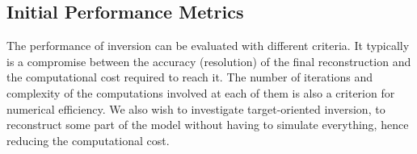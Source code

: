 \subsection{Initial Performance Metrics}
\label{sec:WP4:Hawen:metrics}


The performance of inversion can be evaluated with different
criteria. 
It typically is a compromise between the accuracy (resolution) 
of the final reconstruction and the computational cost required
to reach it. 
The number of iterations and complexity of the computations involved 
at each of them is also a criterion for numerical efficiency.
We also wish to investigate target-oriented inversion, to reconstruct
some part of the model without having to simulate everything, hence
reducing the computational cost.


%

